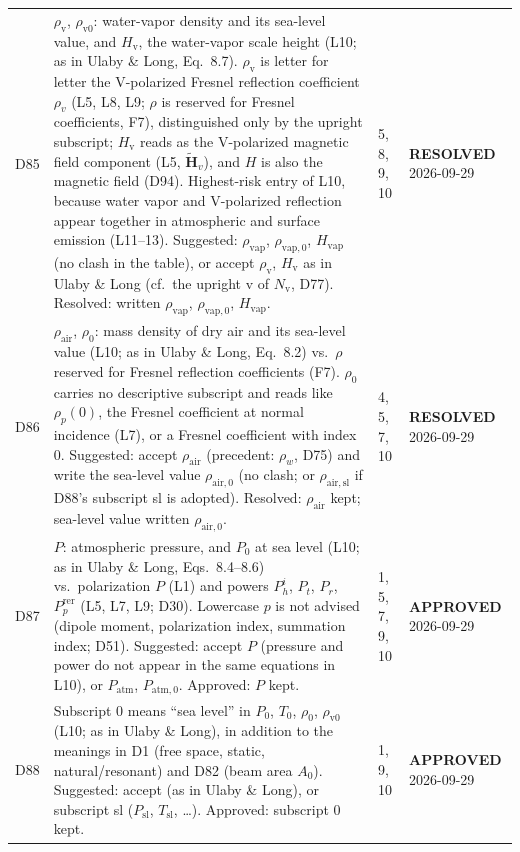 \documentclass[11pt, oneside]{article}
\newcommand{\approved}{\textbf{APPROVED}}
\newcommand{\resolved}{\textbf{RESOLVED}}
\begin{document}
\begin{longtable}{l >{\raggedright\arraybackslash}p{} l l}
D85 & $\rho_\mathrm{v}$, $\rho_\mathrm{v0}$: water-vapor density and its sea-level value, and $H_\mathrm{v}$, the water-vapor scale height (L10; as in Ulaby \& Long, Eq.~8.7). $\rho_\mathrm{v}$ is letter for letter the V-polarized Fresnel reflection coefficient $\rho_v$ (L5, L8, L9; $\rho$ is reserved for Fresnel coefficients, F7), distinguished only by the upright subscript; $H_\mathrm{v}$ reads as the V-polarized magnetic field component (L5, $\tilde{\mathbf{H}}_v$), and $H$ is also the magnetic field (D94). Highest-risk entry of L10, because water vapor and V-polarized reflection appear together in atmospheric and surface emission (L11--13). Suggested: $\rho_\mathrm{vap}$, $\rho_{\mathrm{vap},0}$, $H_\mathrm{vap}$ (no clash in the table), or accept $\rho_\mathrm{v}$, $H_\mathrm{v}$ as in Ulaby \& Long (cf.\ the upright v of $N_\mathrm{v}$, D77). Resolved: written $\rho_\mathrm{vap}$, $\rho_{\mathrm{vap},0}$, $H_\mathrm{vap}$. & 5, 8, 9, 10 & \resolved{} 2026-09-29 \\
D86 & $\rho_\mathrm{air}$, $\rho_0$: mass density of dry air and its sea-level value (L10; as in Ulaby \& Long, Eq.~8.2) vs.\ $\rho$ reserved for Fresnel reflection coefficients (F7). $\rho_0$ carries no descriptive subscript and reads like $\rho_p(0)$, the Fresnel coefficient at normal incidence (L7), or a Fresnel coefficient with index 0. Suggested: accept $\rho_\mathrm{air}$ (precedent: $\rho_w$, D75) and write the sea-level value $\rho_{\mathrm{air},0}$ (no clash; or $\rho_{\mathrm{air,sl}}$ if D88's subscript sl is adopted). Resolved: $\rho_\mathrm{air}$ kept; sea-level value written $\rho_{\mathrm{air},0}$. & 4, 5, 7, 10 & \resolved{} 2026-09-29 \\
D87 & $P$: atmospheric pressure, and $P_0$ at sea level (L10; as in Ulaby \& Long, Eqs.~8.4--8.6) vs.\ polarization $P$ (L1) and powers $P_h^i$, $P_t$, $P_r$, $P_p^\mathrm{rer}$ (L5, L7, L9; D30). Lowercase $p$ is not advised (dipole moment, polarization index, summation index; D51). Suggested: accept $P$ (pressure and power do not appear in the same equations in L10), or $P_\mathrm{atm}$, $P_{\mathrm{atm},0}$. Approved: $P$ kept. & 1, 5, 7, 9, 10 & \approved{} 2026-09-29 \\
D88 & Subscript 0 means ``sea level'' in $P_0$, $T_0$, $\rho_0$, $\rho_\mathrm{v0}$ (L10; as in Ulaby \& Long), in addition to the meanings in D1 (free space, static, natural/resonant) and D82 (beam area $A_0$). Suggested: accept (as in Ulaby \& Long), or subscript sl ($P_\mathrm{sl}$, $T_\mathrm{sl}$, \ldots). Approved: subscript 0 kept. & 1, 9, 10 & \approved{} 2026-09-29 \\

\end{longtable}
\end{document}
